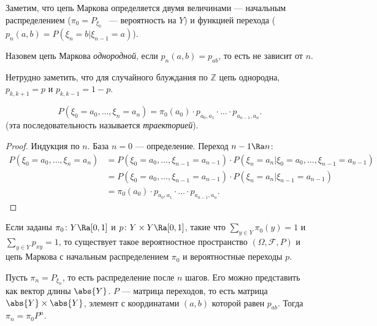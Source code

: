 Заметим, что цепь Маркова определяется двумя величинами --- начальным распределением ($\pi_0 = P_{\xi_0}$ ~--- вероятность на $Y$) и функцией перехода ($p_n(a, b) = P(\xi_n = b | \xi_{n - 1} = a)$).


 \begin{definition}
     Назовем цепь Маркова \textit{однородной}, если $p_n(a, b) = p_{ab}$, то есть не зависит от $n$.
 \end{definition}

    Нетрудно заметить, что для случайного блуждания по $\mathbb{Z}$ цепь однородна, $p_{k, k + 1} = p$ и $p_{k, k - 1} = 1-p$.

 \begin{theorem}
     $$P(\xi_0 = a_0, \ldots, \xi_n = a_n) = \pi_0(a_0)\cdot p_{a_0, a_1}\cdot\ldots\cdot p_{a_{n - 1}, a_n}.$$ (эта последовательность называется \textit{траекторией}).
 \end{theorem}

 \begin{proof}
     Индукция по $n$.
     База $n=0$ --- определение.
     Переход $n - 1\Ra n$:
    \begin{align*}
        P(\xi_0 = a_0, \ldots, \xi_n = a_n) &= P(\xi_0 = a_0 , \ldots, \xi_{n - 1} = a_{n - 1})\cdot P(\xi_n = a_n | \xi_0 = a_0, \ldots, \xi_{n - 1} =
         a_{n - 1}) \\&= P(\xi_0 = a_0 , \ldots, \xi_{n - 1} = a_{n - 1})\cdot P(\xi_n = a_n | \xi_{n - 1} = a_{n - 1})  \\&=
         \pi_0(a_0)\cdot p_{a_0, a_1}\cdot\ldots\cdot p_{a_{n - 1}, a_n}.
    \end{align*}
 \end{proof}

 \begin{theorem}
     Если заданы $\pi_0\colon Y \Ra [0, 1]$ и $p\colon Y\times Y \Ra [0,1]$, такие что $\sum_{y\in Y}\pi_0(y) = 1$ и
     $\sum_{y\in Y} p_{xy} = 1$, то существует такое вероятностное пространство $(\Omega, \mathcal{F}, P)$ и цепь Маркова
     с начальным распределением $\pi_0$ и вероятностные переходы $p$.
 \end{theorem}

 
 \begin{theorem}
     Пусть $\pi_n = P_{\xi_n}$, то есть распределение после $n$ шагов. Его можно представить как вектор
     длины $\abs{Y}$. $P$ --- матрица переходов, то есть матрица $\abs{Y} \times \abs{Y}$, элемент с координатами $(a, b)$ которой равен $p_{ab}$. Тогда
     $\pi_n = \pi_0 P^n$.
 \end{theorem}

